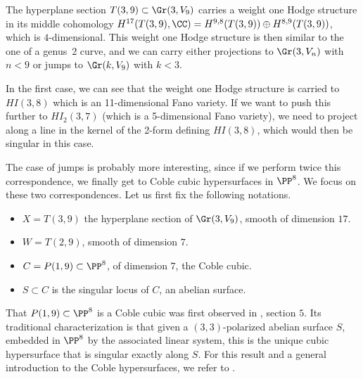 \label{sect:coble}
The hyperplane section $T(3,9) \subset \Gr(3,V_9)$ carries a weight one Hodge structure in its middle cohomology
$H^{17}(T(3,9),\CC) = H^{9,8}(T(3,9)) \oplus H^{8,9}(T(3,9))$, which is $4$\nobreakdash-dimensional. This weight one Hodge structure
is then similar to the one of a genus~$2$ curve, and we can carry either projections to $\Gr(3,V_n)$ with
$n < 9$ or jumps to $\Gr(k,V_9)$ with $k < 3$.

In the first case, we can see that the weight one Hodge structure is carried to
$HI(3,8)$ which is an 11-dimensional Fano variety. If we want to push this further to
$HI_2(3,7)$ (which is a 5-dimensional Fano variety), we need to project along a line in the kernel of the 2-form defining $HI(3,8)$, which would then be singular in this case.

The case of jumps is probably more interesting, since if we perform twice this correspondence, we finally get
to Coble cubic hypersurfaces in $\PP^8$. We focus on these two correspondences. Let us first fix the
following notations.

\begin{itemize}
\item[] $X= T(3,9)$ the hyperplane section of $\Gr(3,V_9)$, smooth of dimension $17$.
\item[] $W=T(2,9)$, smooth of dimension $7$.
\item[] $C=P(1,9) \subset \PP^8$, of dimension $7$, the Coble cubic.
\item[] $S \subset C$ is the singular locus of $C$, an abelian surface.
\end{itemize}
That $P(1,9) \subset \PP^8$ is a Coble cubic was first observed in \cite{gsw}, section $5$.
Its traditional
characterization is that given a $(3,3)$-polarized abelian surface $S$, embedded in $\PP^8$
by the associated linear system, this is the unique cubic hypersurface that is singular
exactly along $S$. For this result and a general introduction to the Coble hypersurfaces,
we refer to \cite{beauville-coble}.

